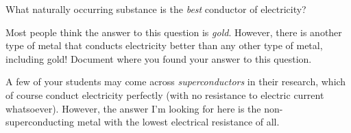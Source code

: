 

What naturally occurring substance is the {\it best} conductor of electricity?







Most people think the answer to this question is {\it gold}.  However, there is another type of metal that conducts electricity better than any other type of metal, including gold!  Document where you found your answer to this question.







A few of your students may come across {\it superconductors} in their research, which of course conduct electricity perfectly (with no resistance to electric current whatsoever).  However, the answer I'm looking for here is the non-superconducting metal with the lowest electrical resistance of all.




